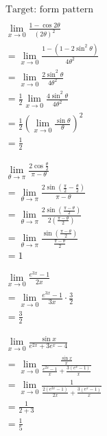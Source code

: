 \documentclass{article}
\begin{document}
\begin{multicols}{3}
\noindent\begin{align*}
	&\text{Target: form pattern} \\
	\\
	&\lim_{x \to 0} \frac{1-\cos 2\theta}{(2\theta)^2} \\
	&= \lim_{x \to 0} \frac{1-(1-2\sin^2 \theta)}{4\theta^2} \\
	&= \lim_{x \to 0} \frac{2\sin^2 \theta}{4\theta^2} \\
	&= \frac{1}{2} \lim_{x \to 0} \frac{4\sin^2 \theta}{4\theta^2} \\
	&= \frac{1}{2} (\lim_{x \to 0} \frac{\sin \theta}{\theta})^2 \\
	&= \frac{1}{2} \\
	\\
	\\
	&\lim_{\theta \to \pi} \frac{2\cos \frac{\theta}{2}}{\pi-\theta} \\
	&= \lim_{\theta \to \pi} \frac{2\sin (\frac{\pi}{2}-\frac{\theta}{2})}{\pi-\theta} \\
	&= \lim_{\theta \to \pi} \frac{2\sin (\frac{\pi-\theta}{2})}{2(\frac{\pi-\theta}{2})} \\
	&= \lim_{\theta \to \pi} \frac{\sin (\frac{\pi-\theta}{2})}{\frac{\pi-\theta}{2}} \\
	&= 1 \\
	\\
	\\
	&\lim_{x \to 0} \frac{e^{3x} - 1}{2x} \\
	&= \lim_{x \to 0} \frac{e^{3x} - 1}{3x} \cdot \frac{3}{2} \\
	&= \frac{3}{2} \\
	\\
	\\
	&\lim_{x \to 0} \frac{\sin x}{e^{2x}+3e^x-4} \\
	&= \lim_{x \to 0} \frac{\frac{\sin x}{x}}{\frac{e^{2x}-1}{x}+\frac{3(e^x-1)}{x}} \\
	&= \lim_{x \to 0} \frac{1}{\frac{2(e^{2x}-1)}{2x}+\frac{3(e^x-1)}{x}} \\
	&= \frac{1}{2+3} \\
	&= \frac{1}{5} \\
\end{align*}

\columnbreak


\end{multicols}
\end{document}
